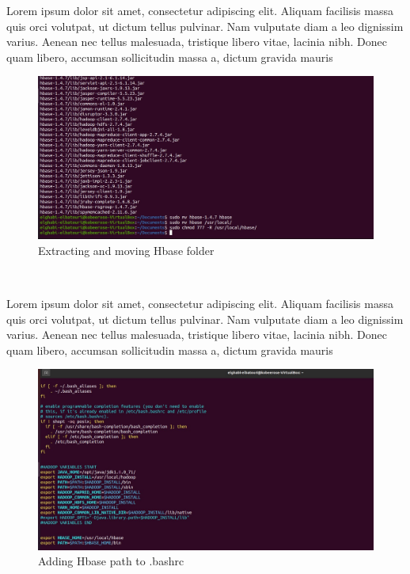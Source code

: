 \begin{spacing}{1.2}
\par Lorem ipsum dolor sit amet, consectetur adipiscing elit. Aliquam facilisis massa quis orci volutpat, ut dictum tellus pulvinar. Nam vulputate diam a leo dignissim varius. Aenean nec tellus malesuada, tristique libero vitae, lacinia nibh. Donec quam libero, accumsan sollicitudin massa a, dictum gravida mauris
\\
\begin{figure}[!htb] 
\begin{center} 
\includegraphics[width=1\linewidth]{Pictures/HBase/Configuring Hbase in Standalone & Pseudo-distributed mode/Installing and Configuring Apache Hbase/Extracting and moving Hbase folder} 
\end{center} 
\caption{Extracting and moving Hbase folder} 
\end{figure}  \FloatBarrier
\\

\par Lorem ipsum dolor sit amet, consectetur adipiscing elit. Aliquam facilisis massa quis orci volutpat, ut dictum tellus pulvinar. Nam vulputate diam a leo dignissim varius. Aenean nec tellus malesuada, tristique libero vitae, lacinia nibh. Donec quam libero, accumsan sollicitudin massa a, dictum gravida mauris
\\
\begin{figure}[!htb] 
\begin{center} 
\includegraphics[width=1\linewidth]{Pictures/HBase/Configuring Hbase in Standalone & Pseudo-distributed mode/Installing and Configuring Apache Hbase/Adding Hbase path to .bashrc} 
\end{center} 
\caption{Adding Hbase path to .bashrc} 
\end{figure}  \FloatBarrier
\\


\end{spacing}
